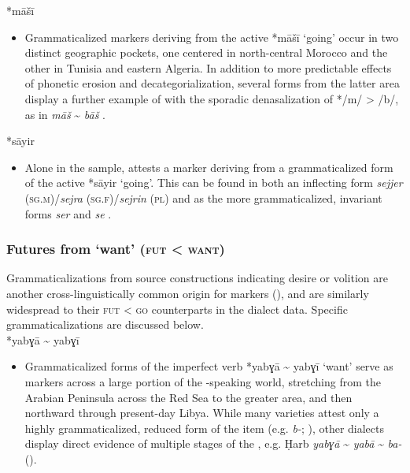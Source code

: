 \documentclass[output=paper]{langsci/langscibook}
\begin{document}
*māšī

\begin{itemize}

  \item[]
Grammaticalized  markers deriving from the active  *māšī ‘going’ occur in two distinct geographic pockets, one centered in north-central Morocco and the other in Tunisia and eastern Algeria. In addition to more predictable effects of phonetic erosion and decategorialization, several forms from the latter area display a further example of  with the sporadic denasalization of */m/ > /b/, as in  \textit{māš} {\textasciitilde} \textit{bāš} \citep{Talmoudi1980}.
\end{itemize}
 
*sāyir

\begin{itemize}

 \item[]
Alone in the sample,  attests a  marker deriving from a grammaticalized form of the active  *sāyir ‘going’. This can be found in both an inflecting form \textit{sejjer} (\textsc{sg.m})/\textit{sejra} (\textsc{sg.f})/\textit{sejrin} (\textsc{pl}) and as the more grammaticalized, invariant forms \textit{ser} and \textit{se} \citep{Vanhove1993}.
\end{itemize}

\subsubsection{ Futures from ‘want’ (\textsc{fut} < \textsc{want})}

Grammaticalizations from source constructions indicating desire or volition are another cross-linguistically common origin for   markers (\citealt{Bybee1994,HeineKuteva2002}), and are similarly widespread to their \textsc{fut} < \textsc{go} counterparts in the  dialect data. Specific grammaticalizations are discussed below.\\
 
*yabɣā {\textasciitilde} yabɣī 

\begin{itemize}

  \item[]
Grammaticalized forms of the imperfect verb *yabɣā {\textasciitilde} yabɣī ‘want’ serve as  markers across a large portion of the -speaking world, stretching from the Arabian Peninsula across the Red Sea to the greater  area, and then northward through present-day Libya. While many  varieties attest only a highly grammaticalized, reduced form of the item (e.g.  \textit{b-}; \citealt{Qafisheh1977}), other dialects display direct evidence of multiple stages of the , e.g. Ḥarb \textit{yabɣā} {\textasciitilde} \textit{yabā} {\textasciitilde} \textit{ba-} (\citealt{Il-Hazmy1975}).
\end{itemize}
 
\end{document}
